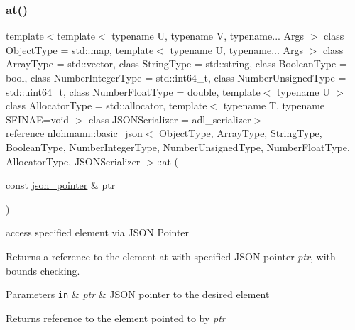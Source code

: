 \subsubsection{\texorpdfstring{at()}{at()}\hspace{0.1cm}{\footnotesize\ttfamily [5/6]}}
{\footnotesize\ttfamily template$<$template$<$ typename U, typename V, typename... Args $>$ class Object\+Type = std\+::map, template$<$ typename U, typename... Args $>$ class Array\+Type = std\+::vector, class String\+Type  = std\+::string, class Boolean\+Type  = bool, class Number\+Integer\+Type  = std\+::int64\+\_\+t, class Number\+Unsigned\+Type  = std\+::uint64\+\_\+t, class Number\+Float\+Type  = double, template$<$ typename U $>$ class Allocator\+Type = std\+::allocator, template$<$ typename T, typename S\+F\+I\+N\+A\+E=void $>$ class J\+S\+O\+N\+Serializer = adl\+\_\+serializer$>$ \\
\mbox{\hyperlink{classnlohmann_1_1basic__json_ac6a5eddd156c776ac75ff54cfe54a5bc}{reference}} \mbox{\hyperlink{classnlohmann_1_1basic__json}{nlohmann\+::basic\+\_\+json}}$<$ Object\+Type, Array\+Type, String\+Type, Boolean\+Type, Number\+Integer\+Type, Number\+Unsigned\+Type, Number\+Float\+Type, Allocator\+Type, J\+S\+O\+N\+Serializer $>$\+::at (\begin{DoxyParamCaption}\item[{const \mbox{\hyperlink{classnlohmann_1_1basic__json_a6886a5001f5b449ad316101a311ce536}{json\+\_\+pointer}} \&}]{ptr }\end{DoxyParamCaption})\hspace{0.3cm}{\ttfamily [inline]}}



access specified element via J\+S\+ON Pointer 

Returns a reference to the element at with specified J\+S\+ON pointer {\itshape ptr}, with bounds checking.


\begin{DoxyParams}[1]{Parameters}
\mbox{\tt in}  & {\em ptr} & J\+S\+ON pointer to the desired element\\
\hline
\end{DoxyParams}
\begin{DoxyReturn}{Returns}
reference to the element pointed to by {\itshape ptr} 
\end{DoxyReturn}

